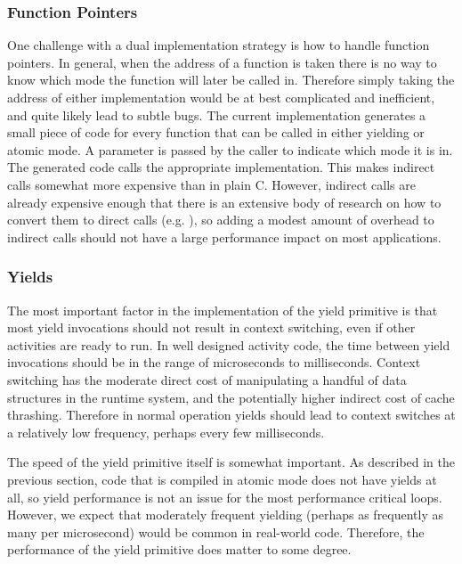 \documentclass[a4paper,UKenglish,cleveref, autoref]{lipics-v2019}
\begin{document}

\subsubsection{Function Pointers}

One challenge with a dual implementation strategy is how to handle function pointers.
In general, when the address of a function is taken there is no way to know which mode the function will later be called in.
Therefore simply taking the address of either implementation would be at best complicated and inefficient, and quite likely lead to subtle bugs.
The current implementation generates a small piece of code for every function that can be called in either yielding or atomic mode.
A parameter is passed by the caller to indicate which mode it is in.
The generated code calls the appropriate implementation.
This makes indirect calls somewhat more expensive than in plain C.
However, indirect calls are already expensive enough that there is an extensive body of research on how to convert them to direct calls (e.g. \cite{Dean1995}), so adding a modest amount of overhead to indirect calls should not have a large performance impact on most applications.

\subsubsection{Yields}

The most important factor in the implementation of the yield primitive is that most yield invocations should not result in context switching, even if other activities are ready to run.
In well designed activity code, the time between yield invocations should be in the range of microseconds to milliseconds.
Context switching has the moderate direct cost of manipulating a handful of data structures in the runtime system, and the potentially higher indirect cost of cache thrashing.
Therefore in normal operation yields should lead to context switches at a relatively low frequency, perhaps every few milliseconds.

The speed of the yield primitive itself is somewhat important.
As described in the previous section, code that is compiled in atomic mode does not have yields at all, so yield performance is not an issue for the most performance critical loops.
However, we expect that moderately frequent yielding (perhaps as frequently as many per microsecond) would be common in real-world code.
Therefore, the performance of the yield primitive does matter to some degree.
\end{document}
